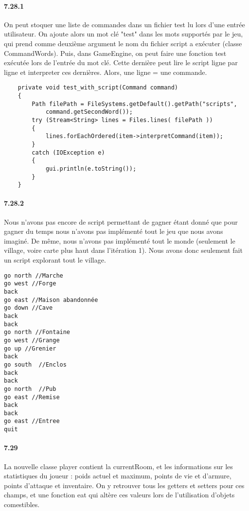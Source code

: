 \documentclass[11pt,a4paper]{report}
\begin{document}
\paragraph{7.28.1}
On peut stoquer une liste de commandes dans un fichier test lu lors d'une entrée utilisateur. On ajoute alors un mot clé "test" dans les mots supportés par le jeu, qui prend comme deuxième argument le nom du fichier script a exécuter (classe CommandWords). Puis, dans GameEngine, on peut faire une fonction test exécutée lors de l'entrée du mot clé. Cette dernière peut lire le script ligne par ligne et interpreter ces dernières. Alors, une ligne = une commande.
\begin{lstlisting}
    private void test_with_script(Command command)
    {
        Path filePath = FileSystems.getDefault().getPath("scripts",
        	command.getSecondWord());
        try (Stream<String> lines = Files.lines( filePath ))
        {
        	lines.forEachOrdered(item->interpretCommand(item));
        }
        catch (IOException e)
        {
        	gui.println(e.toString());
        }
    }
\end{lstlisting}
\paragraph{7.28.2}
Nous n'avons pas encore de script permettant de gagner étant donné que pour gagner du temps nous n'avons pas implémenté tout le jeu que nous avons imaginé. De même, nous n'avons pas implémenté tout le monde (seulement le village, voire carte plus haut dans l'itération 1). Nous avons donc seulement fait un script explorant tout le village.
\begin{lstlisting}
go north //Marche
go west //Forge
back
go east //Maison abandonnée
go down //Cave
back
back
go north //Fontaine
go west //Grange
go up //Grenier
back
go south  //Enclos
back
back
go north  //Pub
go east //Remise
back
back
go east //Entree
quit
\end{lstlisting}

\paragraph{7.29}
La nouvelle classe player contient la currentRoom, et les informations sur les statistiques du joueur : poids actuel et maximum, points de vie et d'armure, points d'attaque et inventaire. On y retrouver tous les getters et setters pour ces champs, et une fonction eat qui altère ces valeurs lors de l'utilisation d'objets comestibles.
\end{document}
